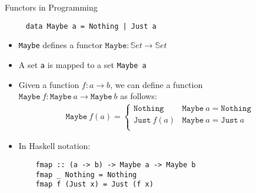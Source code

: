 \begin{frame}[fragile]{Functors in Programming}
 \begin{verbatim}
     data Maybe a = Nothing | Just a
 \end{verbatim}
 \begin{itemize}
  \item \texttt{Maybe} defines a functor $\texttt{Maybe} : \mathbb{S}et \to \mathbb{S}et$
  \item A set \texttt{a} is mapped to a set \texttt{Maybe a}
  \item Given a function $f : a \to b$, we can define a function $\texttt{Maybe}\ f : \texttt{Maybe}\ a \to \texttt{Maybe}\ b$  as follows:
  \begin{align*}
   \texttt{Maybe}\ f(a) = \begin{cases}
                           \texttt{Nothing} & \texttt{Maybe}\ a  = \texttt{Nothing}\\
                           \texttt{Just}\ f(a) & \texttt{Maybe}\ a  = \texttt{Just}\ a\\
                          \end{cases}
  \end{align*}
  \item In Haskell notation:
  \begin{verbatim}
    fmap :: (a -> b) -> Maybe a -> Maybe b
    fmap _ Nothing = Nothing
    fmap f (Just x) = Just (f x)
  \end{verbatim}

 \end{itemize}
\end{frame}
